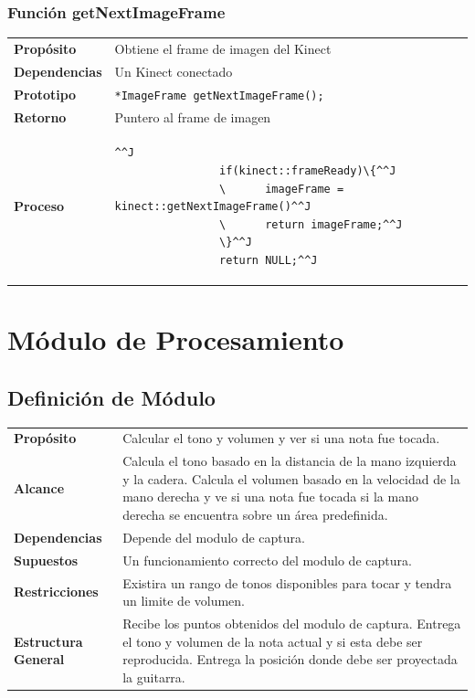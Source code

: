 \documentclass[a4paper,10pt]{article}
\begin{document}
\subsubsection{Función getNextImageFrame}
\begin{tabularx}{\textwidth}{p{25mm} X}
        \textbf{Propósito} & Obtiene el frame de imagen del Kinect \\
        \textbf{Dependencias} & Un Kinect conectado \\
        \textbf{Prototipo} & \lstinline{*ImageFrame getNextImageFrame();}\\
        \textbf{Retorno} & Puntero al frame de imagen \\
        \textbf{Proceso} & 
        \begin{lstlisting}[breaklines=true]^^J
                if(kinect::frameReady)\{^^J
                \      imageFrame = kinect::getNextImageFrame()^^J
                \      return imageFrame;^^J
                \}^^J
                return NULL;^^J
        \end{lstlisting} \\
\end{tabularx}

\section{Módulo de Procesamiento}
\label{sec:procesamiento}
\subsection{Definición de Módulo}
\begin{tabularx}{\textwidth}{p{25mm} X}
        \textbf{Propósito} & Calcular el tono y volumen y ver si una nota fue tocada.\\
        \textbf{Alcance} & Calcula el tono basado en la distancia de la mano izquierda y la cadera. Calcula el volumen basado en la velocidad de la mano derecha y ve si una nota fue tocada si la mano derecha se encuentra sobre un área predefinida.\\
        \textbf{Dependencias} & Depende del modulo de captura.\\
        \textbf{Supuestos} & Un funcionamiento correcto del modulo de captura.\\
        \textbf{Restricciones} & Existira un rango de tonos disponibles para tocar y tendra un limite de volumen.\\
        \textbf{Estructura General} & Recibe los puntos obtenidos del modulo de captura. Entrega el tono y volumen de la nota actual y si esta debe ser reproducida. Entrega la posición donde debe ser proyectada la guitarra. \\
\end{tabularx}
\end{document}
